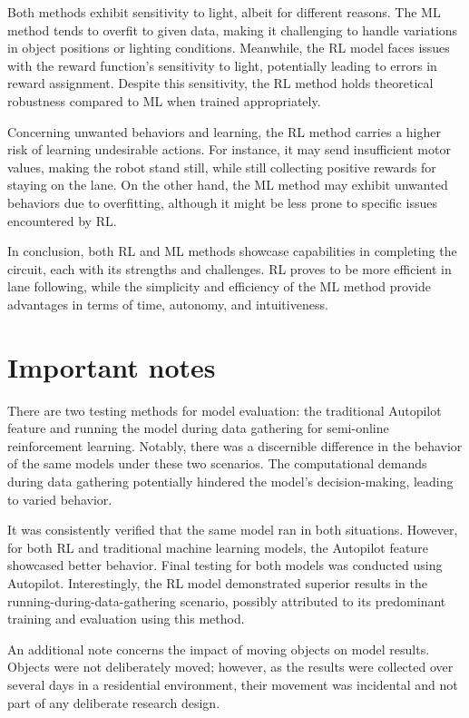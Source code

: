 \documentclass[12pt]{report}
\begin{document}
Both methods exhibit sensitivity to light, albeit for different reasons. The ML method tends to overfit to given data, making it challenging to handle variations in object positions or lighting conditions. Meanwhile, the RL model faces issues with the reward function's sensitivity to light, potentially leading to errors in reward assignment. Despite this sensitivity, the RL method holds theoretical robustness compared to ML when trained appropriately.

Concerning unwanted behaviors and learning, the RL method carries a higher risk of learning undesirable actions. For instance, it may send insufficient motor values, making the robot stand still, while still collecting positive rewards for staying on the lane. On the other hand, the ML method may exhibit unwanted behaviors due to overfitting, although it might be less prone to specific issues encountered by RL.

In conclusion, both RL and ML methods showcase capabilities in completing the circuit, each with its strengths and challenges. RL proves to be more efficient in lane following, while the simplicity and efficiency of the ML method provide advantages in terms of time, autonomy, and intuitiveness.


\section{Important notes}

There are two testing methods for model evaluation: the traditional Autopilot feature and running the model during data gathering for semi-online reinforcement learning. Notably, there was a discernible difference in the behavior of the same models under these two scenarios. The computational demands during data gathering potentially hindered the model's decision-making, leading to varied behavior.

It was consistently verified that the same model ran in both situations. However, for both RL and traditional machine learning models, the Autopilot feature showcased better behavior. Final testing for both models was conducted using Autopilot. Interestingly, the RL model demonstrated superior results in the running-during-data-gathering scenario, possibly attributed to its predominant training and evaluation using this method.

An additional note concerns the impact of moving objects on model results. Objects were not deliberately moved; however, as the results were collected over several days in a residential environment, their movement was incidental and not part of any deliberate research design.
\end{document}
